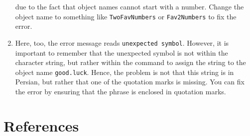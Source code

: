 \documentclass[
  letterpaper,
  DIV=11,
  numbers=noendperiod]{scrreprt}
\begin{document}
\begin{tcolorbox}
\begin{enumerate}
  due to the fact that object names cannot start with a number. Change
  the object name to something like \texttt{TwoFavNumbers} or
  \texttt{Fav2Numbers} to fix the error.
\item
  Here, too, the error message reads \texttt{unexpected\ symbol}.
  However, it is important to remember that the unexpected symbol is not
  within the character string, but rather within the command to assign
  the string to the object name \texttt{good.luck}. Hence, the problem
  is not that this string is in Persian, but rather that one of the
  quotation marks is missing. You can fix the error by ensuring that the
  phrase is enclosed in quotation marks.
\end{enumerate}

\end{tcolorbox}


\chapter*{References}\label{references}

\end{document}
